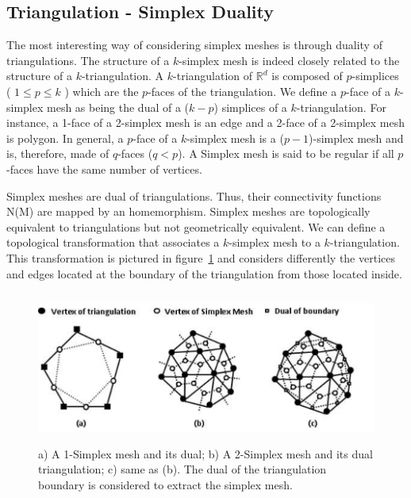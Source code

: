 \documentclass{InsightArticle}
\begin{document}
\subsection{Triangulation - Simplex Duality}
The most interesting way of considering simplex meshes is through duality of triangulations. The structure of a $k$-simplex mesh is indeed closely related to the structure of a $k$-triangulation. A $k$-triangulation of $\mathbb{R}^d$ is composed of $p$-simplices ( $1 \leq p \leq k$ ) which are the $p$-faces of the triangulation. We define a $p$-face of a $k$-simplex mesh as being the dual of a ($k-p$) simplices of a $k$-triangulation. For instance, a 1-face of a 2-simplex mesh is an edge and a 2-face of a 2-simplex mesh is polygon. In general, a $p$-face of a $k$-simplex mesh is a ($p-1$)-simplex mesh and is, therefore, made of $q$-faces ($q < p$). A Simplex mesh is said to be regular if all $p$-faces have the same number of vertices.

Simplex meshes are dual of triangulations. Thus, their connectivity functions N(M) are mapped by an homemorphism. Simplex meshes are topologically equivalent to triangulations but not geometrically equivalent. We can define a topological transformation that associates a $k$-simplex mesh to a $k$-triangulation. This transformation is pictured in figure~\ref{fig:simplexMeshes} and considers differently the vertices and edges located at the boundary of the triangulation from those located inside. 
\begin{figure}
	\centering
	\includegraphics[width=150mm, height=50mm]{SimplexMesh_Examples}
	\caption{a) A 1-Simplex mesh and its dual; b) A 2-Simplex mesh and its dual triangulation; c) same as (b). The dual of the triangulation boundary is considered to extract the simplex mesh.}
	\label{fig:simplexMeshes}
\end{figure}
\end{document}
